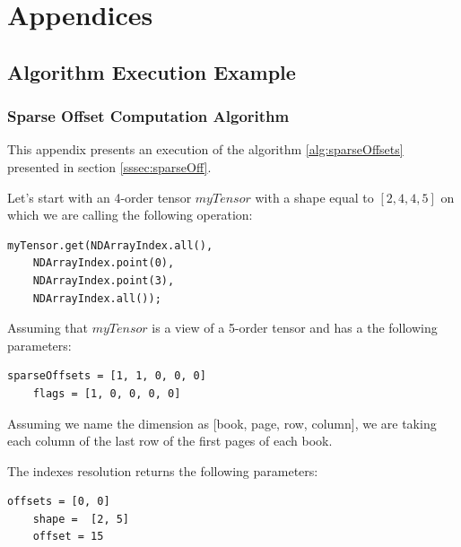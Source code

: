 \appendix
\chapter{Appendices}
\section{Algorithm Execution Example}
\subsection{Sparse Offset Computation Algorithm}
\label{ch:spaoffexec}

	This appendix presents an execution of the algorithm \ref{alg:sparseOffsets} presented in section \ref{sssec:sparseOff}.
	
	Let's start with an 4-order tensor $myTensor$  with a shape equal to $[2, 4, 4, 5]$ on which we are calling the following operation:
	
	\begin{lstlisting}[style=nonumbers]
	myTensor.get(NDArrayIndex.all(),
	NDArrayIndex.point(0),
	NDArrayIndex.point(3),
	NDArrayIndex.all());
	\end{lstlisting}
	
	Assuming that $myTensor$ is a view of a 5-order tensor and has a the following parameters:
	
	\begin{lstlisting}[style=nonumbers]		
	sparseOffsets = [1, 1, 0, 0, 0]
	flags = [1, 0, 0, 0, 0]
	\end{lstlisting}
	
	Assuming we name the dimension as [book, page, row, column], we are taking each column of the last row of the first pages of each book.
	
	The indexes resolution returns the following parameters:
	
	\begin{lstlisting}[style=nonumbers]
	offsets = [0, 0]
	shape =  [2, 5]
	offset = 15
	\end{lstlisting}
	
